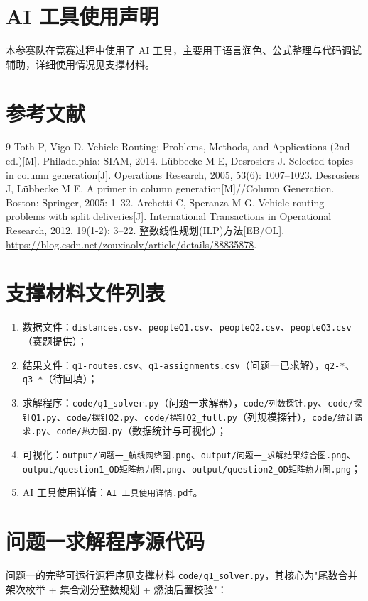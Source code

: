 \documentclass[zihao=-4,a4paper]{ctexart}
\begin{document}
\section*{AI 工具使用声明}

本参赛队在竞赛过程中使用了 AI 工具，主要用于语言润色、公式整理与代码调试辅助，详细使用情况见支撑材料。

\section*{参考文献}

\begin{thebibliography}{9}
 Toth P, Vigo D. Vehicle Routing: Problems, Methods, and Applications (2nd ed.)[M]. Philadelphia: SIAM, 2014.
 L{\"u}bbecke M E, Desrosiers J. Selected topics in column generation[J]. Operations Research, 2005, 53(6): 1007--1023.
 Desrosiers J, L{\"u}bbecke M E. A primer in column generation[M]//Column Generation. Boston: Springer, 2005: 1--32.
 Archetti C, Speranza M G. Vehicle routing problems with split deliveries[J]. International Transactions in Operational Research, 2012, 19(1-2): 3--22.
 整数线性规划(ILP)方法[EB/OL]. \url{https://blog.csdn.net/zouxiaolv/article/details/88835878}.
\end{thebibliography}

\appendix
\section{支撑材料文件列表}

\begin{enumerate}[itemsep=1pt]
  \item 数据文件：\texttt{distances.csv}、\texttt{peopleQ1.csv}、\texttt{peopleQ2.csv}、\texttt{peopleQ3.csv}（赛题提供）；
  \item 结果文件：\texttt{q1-routes.csv}、\texttt{q1-assignments.csv}（问题一已求解），\texttt{q2-*}、\texttt{q3-*}（待回填）；
  \item 求解程序：\texttt{code/q1\_solver.py}（问题一求解器），\texttt{code/列数探针.py}、\texttt{code/探针Q1.py}、\texttt{code/探针Q2.py}、\texttt{code/探针Q2\_full.py}（列规模探针），\texttt{code/统计请求.py}、\texttt{code/热力图.py}（数据统计与可视化）；
  \item 可视化：\texttt{output/问题一\_航线网络图.png}、\texttt{output/问题一\_求解结果综合图.png}、\texttt{output/question1\_OD矩阵热力图.png}、\texttt{output/question2\_OD矩阵热力图.png}；
  \item AI 工具使用详情：\texttt{AI 工具使用详情.pdf}。
\end{enumerate}

\section{问题一求解程序源代码}

问题一的完整可运行源程序见支撑材料 \texttt{code/q1\_solver.py}，其核心为"尾数合并架次枚举 + 集合划分整数规划 + 燃油后置校验"：


\end{document}
